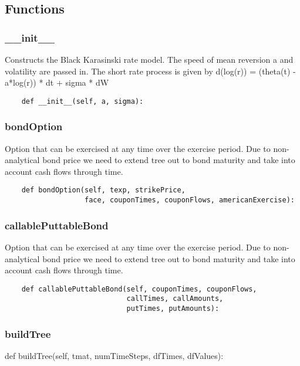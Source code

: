 \documentclass[twoside,11pt]{book}
\begin{document}
\subsection*{Functions}

\subsubsection*{{\bf \_\_init\_\_}}
Constructs the Black Karasinski rate model. The speed of mean reversion a and volatility are passed in. The short rate process is given by d(log(r)) = (theta(t) - a*log(r)) * dt  + sigma * dW  

\begin{lstlisting}
    def __init__(self, a, sigma):
\end{lstlisting}

\subsubsection*{{\bf bondOption}}
Option that can be exercised at any time over the exercise period. Due to non-analytical bond price we need to extend tree out to bond maturity and take into account cash flows through time.  

\begin{lstlisting}
    def bondOption(self, texp, strikePrice,
                   face, couponTimes, couponFlows, americanExercise):
\end{lstlisting}

\subsubsection*{{\bf callablePuttableBond}}
Option that can be exercised at any time over the exercise period. Due to non-analytical bond price we need to extend tree out to bond maturity and take into account cash flows through time.  

\begin{lstlisting}
    def callablePuttableBond(self, couponTimes, couponFlows,
                             callTimes, callAmounts, 
                             putTimes, putAmounts):
\end{lstlisting}

\subsubsection*{{\bf buildTree}}
def buildTree(self, tmat, numTimeSteps, dfTimes, dfValues): 
\end{document}
